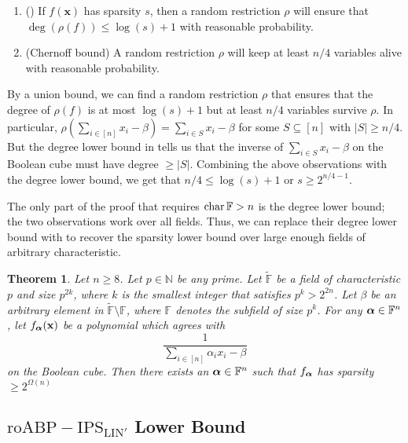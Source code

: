\documentclass[11pt]{article}
\newtheorem{theorem}{Theorem}[section]
\newcommand{\F}{\mathbb{F}}
\newcommand{\IPSLINp}{\mathrm{IPS}_{\mathrm{LIN}'}}
\newcommand{\roABP}{\mathrm{roABP}}
\begin{document}
\begin{enumerate}
    \item (\cite[Lemma 5.5]{FSTW21}) If $f(\mathbf{x})$ has sparsity $s$, then a random restriction $\rho$ will ensure that $\deg(\rho(f)) \leq \log(s) + 1$ with reasonable probability.
    \item (Chernoff bound) A random restriction $\rho$ will keep at least $n/4$ variables alive with reasonable probability.
\end{enumerate}

By a union bound, we can find a random restriction $\rho$ that ensures that the degree of $\rho(f)$ is at most $\log(s) + 1$ but at least $n/4$ variables survive $\rho$. In particular, $\rho(\sum_{i\in [n]}x_i - \beta) = \sum_{i \in S} x_i - \beta$ for some $S\subseteq [n]$ with $|S|\geq n/4$. But the degree lower bound in \cite{FSTW21} tells us that the inverse of $\sum_{i \in S} x_i - \beta$ on the Boolean cube must have degree $\geq |S|$. Combining the above observations with the degree lower bound, we get that $n/4 \leq \log(s) + 1$ or $s \geq 2^{n/4 - 1}$.

The only part of the proof that requires $\char \F > n$ is the degree lower bound; the two observations work over all fields. Thus, we can replace their degree lower bound with  to recover the sparsity lower bound over large enough fields of arbitrary characteristic.

\begin{theorem}
    Let $n \geq 8$.  Let $p\in \mathbb{N}$ be any prime. Let $\tilde{\F}$ be a field of characteristic $p$ and size $p^{2k}$, where $k$ is the smallest integer that satisfies $p^k > 2^{2n}$. Let $\beta$ be an arbitrary element in $\tilde{\F}\setminus\F$, where $\F$ denotes the subfield of size $p^k$. For any $\bfalpha \in \F^{n}$, let $f_{\boldsymbol{\alpha}}(\mathbf{x})$ be a polynomial which agrees with $$\frac{1}{\sum_{i\in [n]}\alpha_{i}x_i - \beta}$$ on the Boolean cube. Then there exists an $\bfalpha \in \F^{n}$ such that $f_{\boldsymbol{\alpha}}$ has sparsity $\geq 2^{\Omega(n)}$
\end{theorem}

\subsection{$\roABP-\IPSLINp$ Lower Bound}
\end{document}
